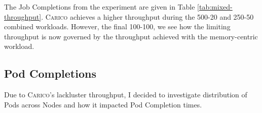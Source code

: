 
The Job Completions from the experiment are given in Table
\ref{tab:mixed-throughput}. \textsc{Carico} achieves a higher throughput during the
500-20 and 250-50 combined workloads. However, the final 100-100, we see how the
limiting throughput is now governed by the throughput achieved with the
memory-centric workload.

\subsection{Pod Completions}
Due to \textsc{Carico}'s lackluster throughput, I decided to investigate distribution of
Pods across Nodes and how it impacted Pod Completion times.

